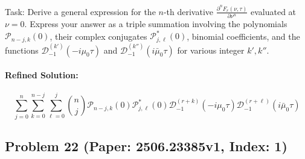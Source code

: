 \documentclass[10pt]{article}
\begin{document}
Task:
Derive a general expression for the $n$-th derivative $\frac{\partial^n F_{r}(\nu, \tau)}{\partial \nu^n}$ evaluated at $\nu=0$. Express your answer as a triple summation involving the polynomials $\mathcal{P}_{n-j,k}(0)$, their complex conjugates $\mathcal{P}^*_{j,\ell}(0)$, binomial coefficients, and the functions $\mathcal{D}^{(k')}_{-1}(-i\mu_0\tau)$ and $\mathcal{D}^{(k'')}_{-1}(i\bar{\mu}_0\tau)$ for various integer $k', k''$.

\paragraph*{Refined Solution:}
\[ \sum_{j=0}^{n}\sum_{k=0}^{n-j}\sum_{\ell=0}^{j}\binom{n}{j}\mathcal{P}_{n-j,k}\left(0\right)\mathcal{P}^{*}_{j,\ell}\left(0\right)\mathcal{D}^{\left(r+k\right)}_{-1}\left(-i\mu_{0}\tau\right)\mathcal{D}^{\left(r+\ell\right)}_{-1}\left(i\bar{\mu}_0\tau\right) \]

\newpage
\subsection*{Problem 22 (Paper: 2506.23385v1, Index: 1)}
\end{document}
